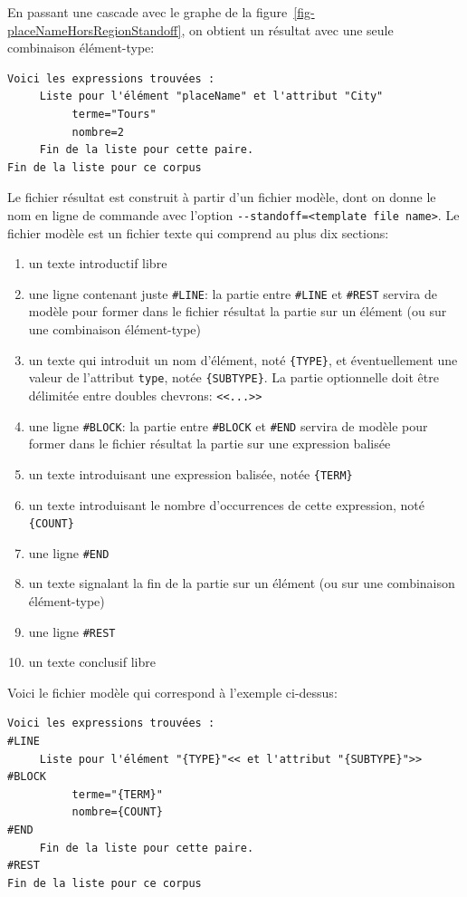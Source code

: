 \noindent En passant une cascade avec le graphe de la figure~\ref{fig-placeNameHorsRegionStandoff},
on obtient un résultat avec une seule combinaison élément-type:
\begin{verbatim}
Voici les expressions trouvées :
     Liste pour l'élément "placeName" et l'attribut "City" 
          terme="Tours" 
          nombre=2 
     Fin de la liste pour cette paire.
Fin de la liste pour ce corpus
\end{verbatim}

\noindent Le fichier résultat est construit à partir d'un fichier modèle, dont on donne le nom en
ligne de commande avec l'option \verb$--standoff=<template file name>$.
Le fichier modèle est un fichier texte qui comprend au plus dix sections:

\begin{enumerate}
\item un texte introductif libre
\item une ligne contenant juste \verb$#LINE$: la partie entre \verb$#LINE$ et \verb$#REST$ servira
de modèle pour former dans le fichier résultat la partie sur un élément (ou sur une combinaison
élément-type)
\item un texte qui introduit un nom d'élément, noté \verb${TYPE}$, et éventuellement une valeur de
l'attribut \verb$type$, notée \verb${SUBTYPE}$. La partie optionnelle doit être délimitée entre
doubles chevrons: \verb$<<...>>$
\item une ligne \verb$#BLOCK$: la partie entre \verb$#BLOCK$ et \verb$#END$ servira de modèle
pour former dans le fichier résultat la partie sur une expression balisée
\item un texte introduisant une expression balisée, notée \verb${TERM}$
\item un texte introduisant le nombre d'occurrences de cette expression, noté \verb${COUNT}$
\item une ligne \verb$#END$
\item un texte signalant la fin de la partie sur un élément (ou sur une combinaison élément-type)
\item une ligne \verb$#REST$
\item un texte conclusif libre
\end{enumerate}

\noindent Voici le fichier modèle qui correspond à l'exemple ci-dessus:
\begin{verbatim}
Voici les expressions trouvées :
#LINE
     Liste pour l'élément "{TYPE}"<< et l'attribut "{SUBTYPE}">>
#BLOCK
          terme="{TERM}"
          nombre={COUNT}
#END
     Fin de la liste pour cette paire.
#REST
Fin de la liste pour ce corpus
\end{verbatim}

